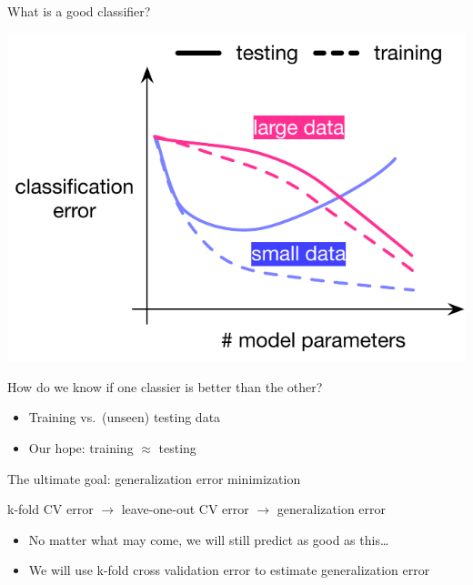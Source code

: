 \documentclass[
  ignorenonframetext,
  aspectratio=169]{beamer}
\begin{document}
\begin{frame}{What is a good classifier?}
{\begin{center}\includegraphics[height=.7\textheight]{Vis/supervised_learning_curves_3} \end{center}


}

\normalsize
\end{frame}

\begin{frame}{How do we know if one classier is better than the other?}
\protect\hypertarget{how-do-we-know-if-one-classier-is-better-than-the-other}{}
\large

\begin{itemize}
\item
  Training vs.~(unseen) testing data
\item
  Our hope: training \(\approx\) testing
\end{itemize}
\end{frame}

\begin{frame}{The ultimate goal: generalization error minimization}
\protect\hypertarget{the-ultimate-goal-generalization-error-minimization}{}
\Large

k-fold CV error \(\to\) leave-one-out CV error \(\to\) generalization
error

\vfill

\normalsize

\begin{itemize}
\item
  No matter what may come, we will still predict as good as this\ldots{}
\item
  We will use k-fold cross validation error to estimate generalization
  error
\end{itemize}
\end{frame}
\end{document}
